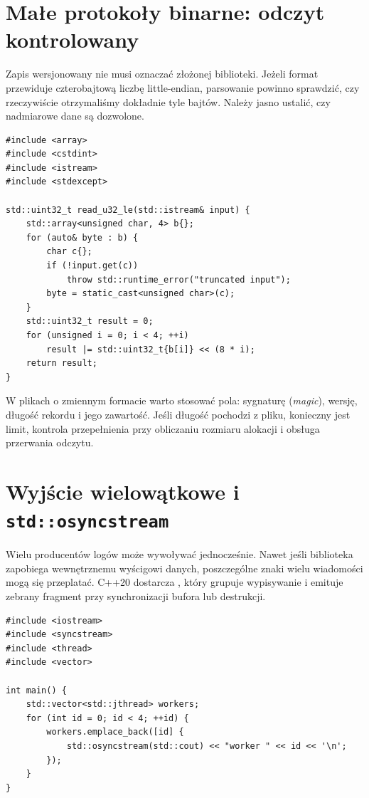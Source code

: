 \section{Małe protokoły binarne: odczyt kontrolowany}

Zapis wersjonowany nie musi oznaczać złożonej biblioteki. Jeżeli
format przewiduje czterobajtową liczbę little-endian, parsowanie
powinno sprawdzić, czy rzeczywiście otrzymaliśmy dokładnie tyle
bajtów. Należy jasno ustalić, czy nadmiarowe dane są dozwolone.

\begin{lstlisting}[caption={Odczyt 32-bitowej liczby little-endian (C++20).}]
#include <array>
#include <cstdint>
#include <istream>
#include <stdexcept>

std::uint32_t read_u32_le(std::istream& input) {
    std::array<unsigned char, 4> b{};
    for (auto& byte : b) {
        char c{};
        if (!input.get(c))
            throw std::runtime_error("truncated input");
        byte = static_cast<unsigned char>(c);
    }
    std::uint32_t result = 0;
    for (unsigned i = 0; i < 4; ++i)
        result |= std::uint32_t{b[i]} << (8 * i);
    return result;
}
\end{lstlisting}

W plikach o zmiennym formacie warto stosować pola: sygnaturę
(\emph{magic}), wersję, długość rekordu i jego zawartość. Jeśli
długość pochodzi z pliku, konieczny jest limit, kontrola przepełnienia
przy obliczaniu rozmiaru alokacji i obsługa przerwania odczytu.

\section{Wyjście wielowątkowe i \texttt{std::osyncstream}}

Wielu producentów logów może wywoływać  jednocześnie.
Nawet jeśli biblioteka zapobiega wewnętrznemu wyścigowi danych,
poszczególne znaki wielu wiadomości mogą się przeplatać.
C++20 dostarcza , który grupuje wypisywanie
i emituje zebrany fragment przy synchronizacji bufora lub destrukcji.

\begin{lstlisting}[caption={Niezachodzace na siebie linie logu (C++20).}]
#include <iostream>
#include <syncstream>
#include <thread>
#include <vector>

int main() {
    std::vector<std::jthread> workers;
    for (int id = 0; id < 4; ++id) {
        workers.emplace_back([id] {
            std::osyncstream(std::cout) << "worker " << id << '\n';
        });
    }
}
\end{lstlisting}

